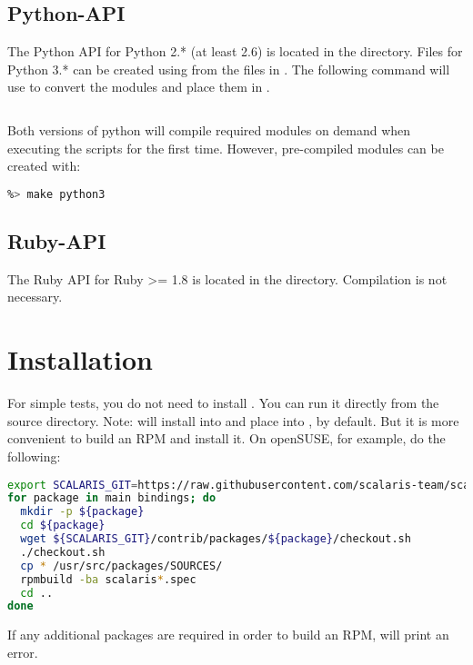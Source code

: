 \subsection{Python-API}

The Python API for Python 2.* (at least 2.6) is located in the 
directory. Files for Python 3.* can be created using  from the files
in . The following command will use  to convert the
modules and place them in . 
\begin{lstlisting}[language=sh]
%> make python3
\end{lstlisting}
Both versions of python will compile required modules on demand when executing
the scripts for the first time. However, pre-compiled modules can be created
with:
\begin{lstlisting}[language=sh]
%> make python
%> make python3
\end{lstlisting}

\subsection{Ruby-API}

The Ruby API for Ruby >= 1.8 is located in the 
directory. Compilation is not necessary.

\section{Installation}
\label{sec:install}

For simple tests, you do not need to install \scalaris{}. You can run it
directly from the source directory. Note:  will install
\scalaris{} into  and place  into
, by default. But it is more convenient to build an RPM
and install it.
On openSUSE, for example, do the following:

\begin{lstlisting}[language=sh]
export SCALARIS_GIT=https://raw.githubusercontent.com/scalaris-team/scalaris/master
for package in main bindings; do
  mkdir -p ${package}
  cd ${package}
  wget ${SCALARIS_GIT}/contrib/packages/${package}/checkout.sh
  ./checkout.sh
  cp * /usr/src/packages/SOURCES/
  rpmbuild -ba scalaris*.spec
  cd ..
done
\end{lstlisting}

If any additional packages are required in order to build an RPM,
 will print an error.

